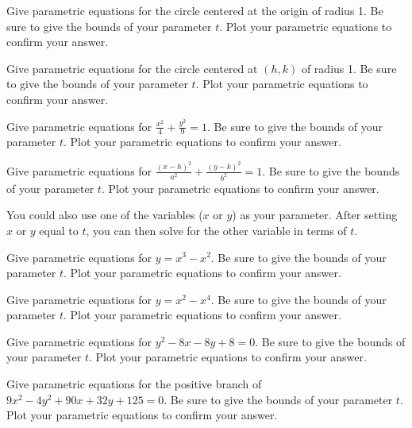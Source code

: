 \question Give parametric equations for the circle centered at the origin of radius 1. Be sure to give the bounds of your parameter $t$. Plot your parametric equations to confirm your answer.

\question Give parametric equations for the circle centered at $(h,k)$ of radius 1. Be sure to give the bounds of your parameter $t$. Plot your parametric equations to confirm your answer.

\question Give parametric equations for $\frac{x^2}{4}+\frac{y^2}{9}=1$. Be sure to give the bounds of your parameter $t$. Plot your parametric equations to confirm your answer.

\question Give parametric equations for $\frac{(x-h)^2}{a^2}+\frac{(y-k)^2}{b^2}=1$. Be sure to give the bounds of your parameter $t$. Plot your parametric equations to confirm your answer.

You could also use one of the variables ($x$ or $y$) as your parameter. After setting $x$ or $y$ equal to $t$, you can then solve for the other variable in terms of $t$.

\question Give parametric equations for $y=x^3-x^2$. Be sure to give the bounds of your parameter $t$. Plot your parametric equations to confirm your answer.

\question Give parametric equations for $y=x^2-x^4$. Be sure to give the bounds of your parameter $t$. Plot your parametric equations to confirm your answer.

\question Give parametric equations for $y^2-8x-8y+8=0$. Be sure to give the bounds of your parameter $t$. Plot your parametric equations to confirm your answer.

\question Give parametric equations for the positive branch of $9x^2-4y^2+90x+32y+125=0$. Be sure to give the bounds of your parameter $t$. Plot your parametric equations to confirm your answer.



